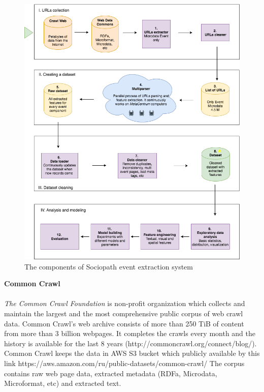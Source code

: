 \begin{figure}[h]
\begin{center}
\includegraphics[width=1.0\textwidth]{figures03/Architecure}
\caption{The components of Sociopath event extraction system}
\label{fig:architecture}
\end{center}
\end{figure}

\vspace{5mm} 
\noindent\textbf{Common Crawl}\\\\
\textit{The Common Crawl Foundation} is non-profit organization which collects and maintain the largest and the most comprehensive public corpus of web crawl data. Common Crawl's web archive consists of more than 250 TiB of content from more than 3 billion webpages. It completes the crawls every month and the history is available for the last 8 years (http://commoncrawl.org/connect/blog/). Common Crawl keeps the data in AWS S3 bucket which publicly available by this link https://aws.amazon.com/ru/public-datasets/common-crawl/  The corpus contains raw web page data, extracted metadata (RDFa, Microdata, Microformat, etc) and extracted text. \\

